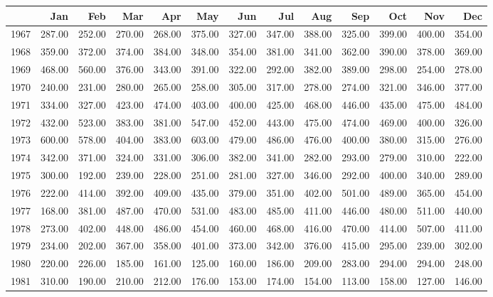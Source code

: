 \begin{longtable}{rrrrrrrrrrrrr}
  \hline
 & Jan & Feb & Mar & Apr & May & Jun & Jul & Aug & Sep & Oct & Nov & Dec \\ 
  \hline
1967 & 287.00 & 252.00 & 270.00 & 268.00 & 375.00 & 327.00 & 347.00 & 388.00 & 325.00 & 399.00 & 400.00 & 354.00 \\ 
  1968 & 359.00 & 372.00 & 374.00 & 384.00 & 348.00 & 354.00 & 381.00 & 341.00 & 362.00 & 390.00 & 378.00 & 369.00 \\ 
  1969 & 468.00 & 560.00 & 376.00 & 343.00 & 391.00 & 322.00 & 292.00 & 382.00 & 389.00 & 298.00 & 254.00 & 278.00 \\ 
  1970 & 240.00 & 231.00 & 280.00 & 265.00 & 258.00 & 305.00 & 317.00 & 278.00 & 274.00 & 321.00 & 346.00 & 377.00 \\ 
  1971 & 334.00 & 327.00 & 423.00 & 474.00 & 403.00 & 400.00 & 425.00 & 468.00 & 446.00 & 435.00 & 475.00 & 484.00 \\ 
  1972 & 432.00 & 523.00 & 383.00 & 381.00 & 547.00 & 452.00 & 443.00 & 475.00 & 474.00 & 469.00 & 400.00 & 326.00 \\ 
  1973 & 600.00 & 578.00 & 404.00 & 383.00 & 603.00 & 479.00 & 486.00 & 476.00 & 400.00 & 380.00 & 315.00 & 276.00 \\ 
  1974 & 342.00 & 371.00 & 324.00 & 331.00 & 306.00 & 382.00 & 341.00 & 282.00 & 293.00 & 279.00 & 310.00 & 222.00 \\ 
  1975 & 300.00 & 192.00 & 239.00 & 228.00 & 251.00 & 281.00 & 327.00 & 346.00 & 292.00 & 400.00 & 340.00 & 289.00 \\ 
  1976 & 222.00 & 414.00 & 392.00 & 409.00 & 435.00 & 379.00 & 351.00 & 402.00 & 501.00 & 489.00 & 365.00 & 454.00 \\ 
  1977 & 168.00 & 381.00 & 487.00 & 470.00 & 531.00 & 483.00 & 485.00 & 411.00 & 446.00 & 480.00 & 511.00 & 440.00 \\ 
  1978 & 273.00 & 402.00 & 448.00 & 486.00 & 454.00 & 460.00 & 468.00 & 416.00 & 470.00 & 414.00 & 507.00 & 411.00 \\ 
  1979 & 234.00 & 202.00 & 367.00 & 358.00 & 401.00 & 373.00 & 342.00 & 376.00 & 415.00 & 295.00 & 239.00 & 302.00 \\ 
  1980 & 220.00 & 226.00 & 185.00 & 161.00 & 125.00 & 160.00 & 186.00 & 209.00 & 283.00 & 294.00 & 294.00 & 248.00 \\ 
  1981 & 310.00 & 190.00 & 210.00 & 212.00 & 176.00 & 153.00 & 174.00 & 154.00 & 113.00 & 158.00 & 127.00 & 146.00 \\ 

\end{longtable}

